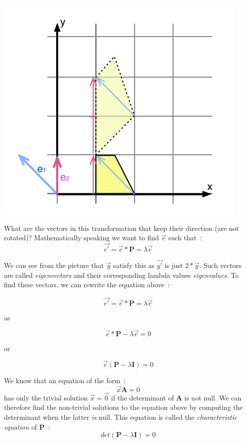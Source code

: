 \documentclass[11pt,twocolumn]{amsart} %
\begin{document}
\includegraphics{eigen.pdf}

What are the vectors in this transformation that keep their direction (are not rotated)? Mathematically speaking we want to find $\vec{e}$ such that~:
\begin{equation*}
  \vec{e'} = \vec{e} * \textbf{P} = \lambda \vec{e}
\end{equation*}

We can see from the picture that $\vec{y}$ satisfy this as $\vec{y'}$ is just $2 * \vec{y}$. Such vectors are called \emph{eigenvectors} and their corresponding lambda values \emph{eigenvalues}. To find these vectors, we can rewrite the equation above~:

\begin{equation*}
  \vec{e'} = \vec{e} * \textbf{P} = \lambda \vec{e}
\end{equation*}

as

\begin{equation*}
  \vec{e} * \textbf{P} - \lambda \vec{e} = 0
\end{equation*}

or 

\begin{equation*}
  \vec{e} (\textbf{P} - \lambda \textbf{I}) = 0  
\end{equation*}

We know that an equation of the form~:
\begin{equation*}
  \vec{x} \textbf{A} = 0
\end{equation*}
has only the trivial solution $\vec{x} = \vec{0}$ if the determinant of $\textbf{A}$ is not null. We can therefore find the non-trivial solutions to the equation above by computing the determinant when the latter \emph{is} null. This equation is called the \emph{characteristic equation} of \textbf{P}~:
\begin{equation*}
  det(\textbf{P} - \lambda \textbf{I}) = 0
\end{equation*}
\end{document}
